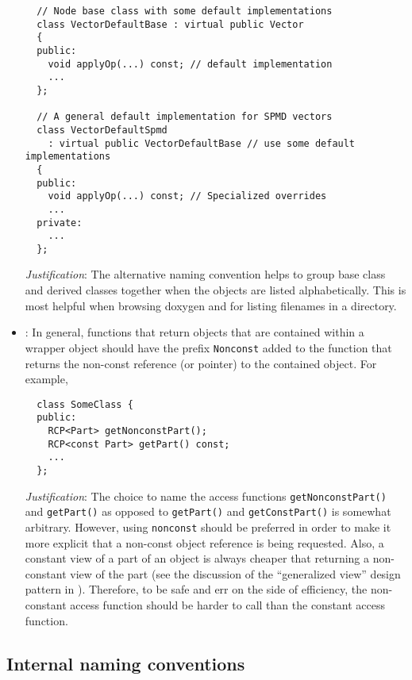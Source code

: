 \begin{itemize}
{\begin{verbatim}
  // Node base class with some default implementations
  class VectorDefaultBase : virtual public Vector
  {
  public:
    void applyOp(...) const; // default implementation
    ...
  };

  // A general default implementation for SPMD vectors
  class VectorDefaultSpmd
    : virtual public VectorDefaultBase // use some default implementations
  {
  public:
    void applyOp(...) const; // Specialized overrides
    ...
  private:
    ...
  };
\end{verbatim}}

\textit{Justification}: The alternative naming convention helps to group base class and derived classes together when the objects are listed alphabetically.  This is most helpful when browsing doxygen and for listing filenames in a directory.  

\item\NCConstNonconstAccessFunctionName: In general, functions that
  return objects that are contained within a wrapper object should
  have the prefix \texttt{Nonconst} added to the function that returns
  the non-const reference (or pointer) to the contained object.  For
  example,

{\small\begin{verbatim}
  class SomeClass {
  public:
    RCP<Part> getNonconstPart();
    RCP<const Part> getPart() const;
    ...
  };
\end{verbatim}}

  \textit{Justification}: The choice to name the access functions
  \texttt{getNonconstPart()} and \texttt{getPart()} as opposed to
  \texttt{getPart()} and \texttt{getConstPart()} is somewhat
  arbitrary.  However, using \texttt{nonconst} should be preferred in
  order to make it more explicit that a non-const object reference is
  being requested.  Also, a constant view of a part of an object is
  always cheaper that returning a non-constant view of the part (see
  the discussion of the ``generalized view'' design pattern in
  {}\cite{TeuchosMemoryManagementGuide}).  Therefore, to be safe and
  err on the side of efficiency, the non-constant access function
  should be harder to call than the constant access function.

\end{itemize}


%
\subsection{Internal naming conventions}
\label{sec:InternalNamingConventions}

